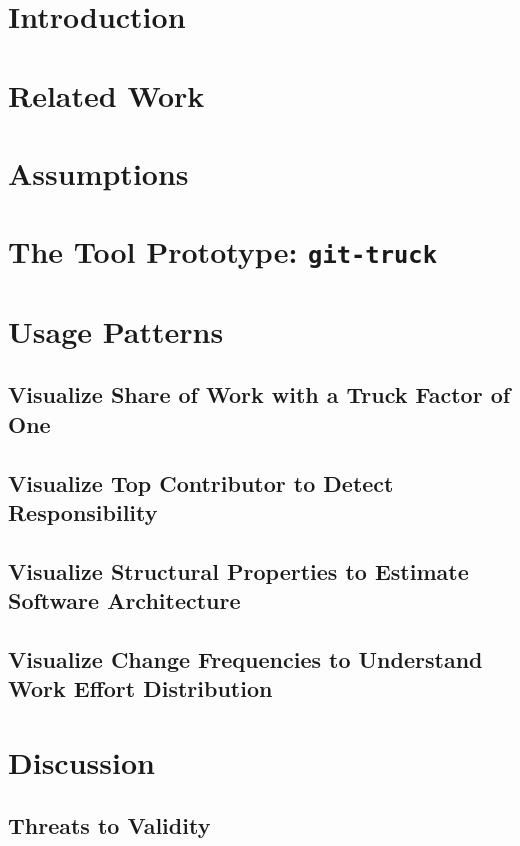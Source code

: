 \documentclass[conference]{IEEEtran}
\newcommand{\toolname}[1]{{\scriptsize \texttt{#1}}}
\begin{document}
\begin{IEEEkeywords}
\end{IEEEkeywords}

\section{Introduction}

\section{Related Work}

\section{Assumptions}

\section{The Tool Prototype: \toolname{git-truck}}

\section{Usage Patterns}

\subsection{Visualize Share of Work with a Truck Factor of One}

\subsection{Visualize Top Contributor to Detect Responsibility}

\subsection{Visualize Structural Properties to Estimate Software Architecture}

\subsection{Visualize Change Frequencies to Understand Work Effort Distribution}


\section{Discussion}

\subsection{Threats to Validity}





\end{document}

